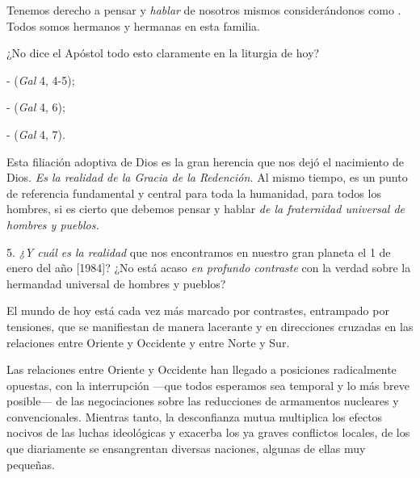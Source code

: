 \begin{body}
	Tenemos derecho a pensar y \emph{hablar} de nosotros mismos considerándonos como . Todos somos hermanos y hermanas en esta familia.
	
	¿No dice el Apóstol todo esto claramente en la liturgia de hoy?
	
	-  (\emph{Gal} 4, 4-5);
	
	-  (\emph{Gal} 4, 6);
	
	-  (\emph{Gal} 4, 7).
	
	Esta filiación adoptiva de Dios es la gran herencia que nos dejó el nacimiento de Dios. \emph{Es la realidad de la Gracia de la Redención.} Al mismo tiempo, es un punto de referencia fundamental y central para toda la humanidad, para todos los hombres, si es cierto que debemos pensar y hablar \emph{de la fraternidad universal de hombres y pueblos.}
	
	5. \emph{¿Y cuál es la realidad} que nos encontramos en nuestro gran planeta el 1 de enero del año {[}1984{]}? ¿No está acaso \emph{en 	profundo contraste} con la verdad sobre la hermandad universal de hombres y pueblos?
	
	El mundo de hoy está cada vez más marcado por contrastes, entrampado por tensiones, que se manifiestan de manera lacerante y en direcciones cruzadas en las relaciones entre Oriente y Occidente y entre Norte y Sur.
	
	Las relaciones entre Oriente y Occidente han llegado a posiciones radicalmente opuestas, con la interrupción ---que todos esperamos sea temporal y lo más breve posible--- de las negociaciones sobre las reducciones de armamentos nucleares y convencionales. Mientras tanto, la desconfianza mutua multiplica los efectos nocivos de las luchas ideológicas y exacerba los ya graves conflictos locales, de los que diariamente se ensangrentan diversas naciones, algunas de ellas muy pequeñas.
	

\end{body}
